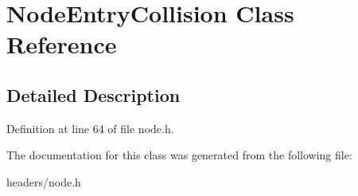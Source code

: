 \hypertarget{classNodeEntryCollision}{\section{Node\+Entry\+Collision Class Reference}
\label{classNodeEntryCollision}
}


\subsection{Detailed Description}


Definition at line 64 of file node.\+h.



The documentation for this class was generated from the following file\+:\begin{DoxyCompactItemize}
\item 
headers/node.\+h\end{DoxyCompactItemize}
